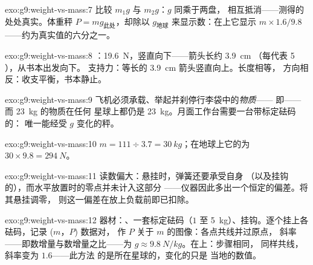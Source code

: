 \begin{solution}{exo:g9:weight-vs-mass:7}
比较 $m_1 g$ 与 $m_2 g$：$g$ 同乘于两盘，
相互抵消——测得的处处真实。体重秤
 $P = m g_{\text{此处}}$，却除以
$g_{\text{地球}}$ 来显示数：在上它显示
$m \times 1.6/9.8$——约为真实值的六分之一。
\end{solution}

\begin{solution}{exo:g9:weight-vs-mass:8}
：\qty{19.6}{N}，竖直向下——箭头长约 \qty{3.9}{cm}
（每代表 5 ），从书本出发向下。
支持力：等长的 \qty{3.9}{cm} 箭头竖直向上。长度相等，
方向相反：收支平衡，书本静止。
\end{solution}

\begin{solution}{exo:g9:weight-vs-mass:9}
飞机必须承载、举起并刹停行李袋中的\emph{物质}——
即——而 \qty{23}{kg} 的物质在任何
星球上都仍是 \qty{23}{kg}。月面工作台需要一台带标定砝码的：
唯一能经受 $g$ 变化的秤。
\end{solution}

\begin{solution}{exo:g9:weight-vs-mass:10}
$m = 111 \div 3.7 = \qty{30}{kg}$；在地球上它的为 $30
\times 9.8 = \qty{294}{N}$。
\end{solution}

\begin{solution}{exo:g9:weight-vs-mass:11}
读数偏大：悬挂时，弹簧还要承受自身
（以及挂钩的），而水平放置时的零点并未计入这部分
——仪器因此多出一个恒定的偏差。将其悬挂调零，
则这一偏差在放上负载前即已扣除。
\end{solution}

\begin{solution}{exo:g9:weight-vs-mass:12}
器材：、一套标定砝码（$1$ 至
\qty{5}{kg}）、挂钩。逐个挂上各砝码，记录 ($m$，$P$) 数据对，
作 $P$ 关于 $m$ 的图像：各点共线并过原点，
斜率——即数增量与数增量之比——为
$g \approx \qty{9.8}{N/kg}$。在上：步骤相同，
同样共线，斜率变为 $1.6$——此方法
的是所在星球的，变化的只是
当地的数值。
\end{solution}

